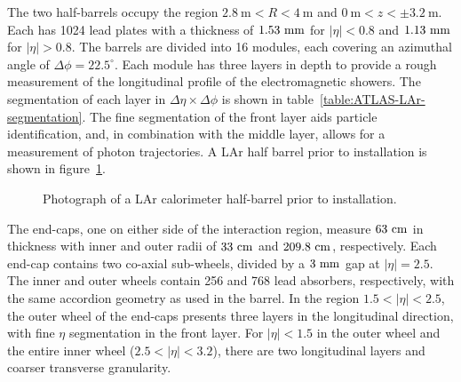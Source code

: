 The two half-barrels occupy the region $2.8~\mbox{m}<R<4~\mbox{m}$ and $0~\mbox{m}<z<\pm3.2~\mbox{m}$. Each has 1024 lead plates with a thickness of $1.53~\mathrm{mm}$ for $|\eta|<0.8$ and $1.13~\mathrm{mm}$ for $|\eta|>0.8$. The barrels are divided into 16 modules, each covering an azimuthal angle of $\Delta \phi = 22.5^{\circ}$. Each module has three layers in depth to provide a rough measurement of the longitudinal profile of the electromagnetic showers. The segmentation of each layer in $\Delta\eta\times\Delta\phi$ is shown in table~\ref{table:ATLAS-LAr-segmentation}. The fine segmentation of the front layer aids particle identification, and, in combination with the middle layer, allows for a measurement of photon trajectories. A LAr half barrel prior to installation is shown in figure~\ref{fig:LAr-barrel}.

\begin{figure}[htbp]
	\centering
	\caption{Photograph of a LAr calorimeter half-barrel prior to installation.}
	\label{fig:LAr-barrel}
\end{figure}


The end-caps, one on either side of the interaction region, measure $63~\mathrm{cm}$ in thickness with inner and outer radii of $33~\mathrm{cm}$ and $209.8~\mathrm{cm}$, respectively. Each end-cap contains two co-axial sub-wheels, divided by a $3~\mathrm{mm}$ gap at $|\eta|=2.5$. The inner and outer wheels contain 256 and 768 lead absorbers, respectively, with the same accordion geometry as used in the barrel. In the region $1.5<|\eta|<2.5$, the outer wheel of the end-caps presents three layers in the longitudinal direction, with fine $\eta$ segmentation in the front layer. For $|\eta|<1.5$ in the outer wheel and the entire inner wheel ($2.5<|\eta|<3.2$), there are two longitudinal layers and coarser transverse granularity.

